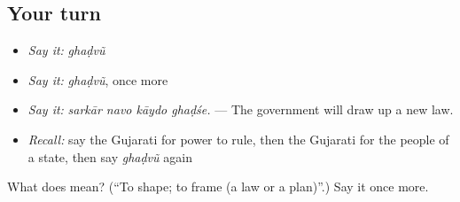 \subsection*{Your turn}
\begin{itemize}
\raggedright
  \item \emph{Say it:} \emph{ghaḍvũ}
  \item \emph{Say it:} \emph{ghaḍvũ}, once more
  \item \emph{Say it:} \emph{sarkār navo kāydo ghaḍśe.} — The government will draw up a new law.
  \item \emph{Recall:} say the Gujarati for power to rule, then the Gujarati for the people of a state, then say \emph{ghaḍvũ} again
\end{itemize}

\begin{tcolorbox}[breakable,colback=teal!4,colframe=teal!35!black,title={Before you move on}]
What does  mean? (\textquotedblleft{}To shape; to frame (a law or a plan)\textquotedblright{}.) Say it once more.
\end{tcolorbox}
